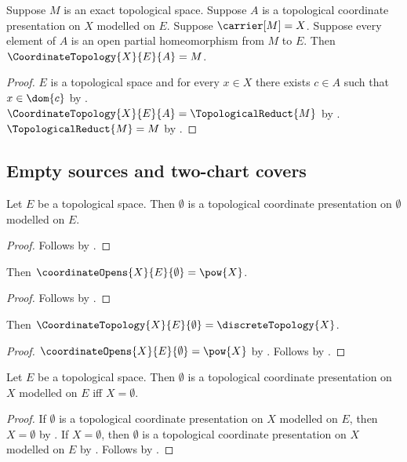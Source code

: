 \begin{theorem}\label{coordinate_topology_unique}
    Suppose $M$ is an exact topological space.
    Suppose $A$ is a topological coordinate presentation on $X$ modelled on $E$.
    Suppose $\carrier[M]=X$.
    Suppose every element of $A$ is an open partial homeomorphism from $M$ to $E$.
    Then $\CoordinateTopology{X}{E}{A}=M$.
\end{theorem}
\begin{proof}
    $E$ is a topological space and for every $x\in X$ there exists
        $c\in A$ such that $x\in\dom{c}$ by
        .
    $\CoordinateTopology{X}{E}{A}=\TopologicalReduct{M}$ by
        .
    $\TopologicalReduct{M}=M$ by .
\end{proof}

\subsection{Empty sources and two-chart covers}

\begin{classification}\label{empty_coordinate_presentation}
    Let $E$ be a topological space.
    Then $\emptyset$ is a topological coordinate presentation on $\emptyset$
        modelled on $E$.
\end{classification}
\begin{proof}
    Follows by .
\end{proof}

\begin{theorem}\label{empty_coordinate_opens}
    Then $\coordinateOpens{X}{E}{\emptyset}=\pow{X}$.
\end{theorem}
\begin{proof}
    Follows by .
\end{proof}

\begin{theorem}\label{empty_coordinate_topology}
    Then $\CoordinateTopology{X}{E}{\emptyset}=\discreteTopology{X}$.
\end{theorem}
\begin{proof}
    $\coordinateOpens{X}{E}{\emptyset}=\pow{X}$ by .
    Follows by .
\end{proof}

\begin{theorem}\label{empty_coordinate_presentation_iff}
    Let $E$ be a topological space.
    Then $\emptyset$ is a topological coordinate presentation on $X$
        modelled on $E$ iff $X=\emptyset$.
\end{theorem}
\begin{proof}
    If $\emptyset$ is a topological coordinate presentation on $X$ modelled on $E$,
        then $X=\emptyset$ by
        .
    If $X=\emptyset$, then $\emptyset$ is a topological coordinate presentation
        on $X$ modelled on $E$ by .
    Follows by \auto.
\end{proof}

